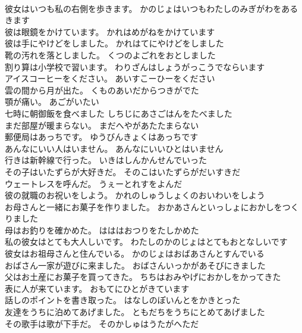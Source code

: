 \documentclass[8pt]{extreport}
\begin{document}
\begin{CJK}{UTF8}{min}
\\	彼女はいつも私の右側を歩きます。	かのじょはいつもわたしのみぎがわをあるきます 
\\	彼は眼鏡をかけています。	かれはめがねをかけています 
\\	彼は手にやけどをしました。	かれはてにやけどをしました 
\\	靴の汚れを落としました。	くつのよごれをおとしました 
\\	割り算は小学校で習います。	わりざんはしょうがっこうでならいます 
\\	アイスコーヒーをください。	あいすこーひーをください 
\\	雲の間から月が出た。	くものあいだからつきがでた 
\\	顎が痛い。	あごがいたい 
\\	七時に朝御飯を食べました	しちじにあさごはんをたべました 
\\	まだ部屋が暖まらない。	まだへやがあたたまらない 
\\	郵便局はあっちです。	ゆうびんきょくはあっちです 
\\	あんなにいい人はいません。	あんなにいいひとはいません 
\\	行きは新幹線で行った。	いきはしんかんせんでいった 
\\	その子はいたずらが大好きだ。	そのこはいたずらがだいすきだ 
\\	ウェートレスを呼んだ。	うぇーとれすをよんだ 
\\	彼の就職のお祝いをしよう。	かれのしゅうしょくのおいわいをしよう 
\\	お母さんと一緒にお菓子を作りました。	おかあさんといっしょにおかしをつくりました 
\\	母はお釣りを確かめた。	はははおつりをたしかめた 
\\	私の彼女はとても大人しいです。	わたしのかのじょはとてもおとなしいです 
\\	彼女はお祖母さんと住んでいる。	かのじょはおばあさんとすんでいる 
\\	おばさん一家が遊びに来ました。	おばさんいっかがあそびにきました 
\\	父はお土産にお菓子を買ってきた。	ちちはおみやげにおかしをかってきた 
\\	表に人が来ています。	おもてにひとがきています 
\\	話しのポイントを書き取った。	はなしのぽいんとをかきとった 
\\	友達をうちに泊めてあげました。	ともだちをうちにとめてあげました 
\\	その歌手は歌が下手だ。	そのかしゅはうたがへただ 

\end{CJK}
\end{document}
